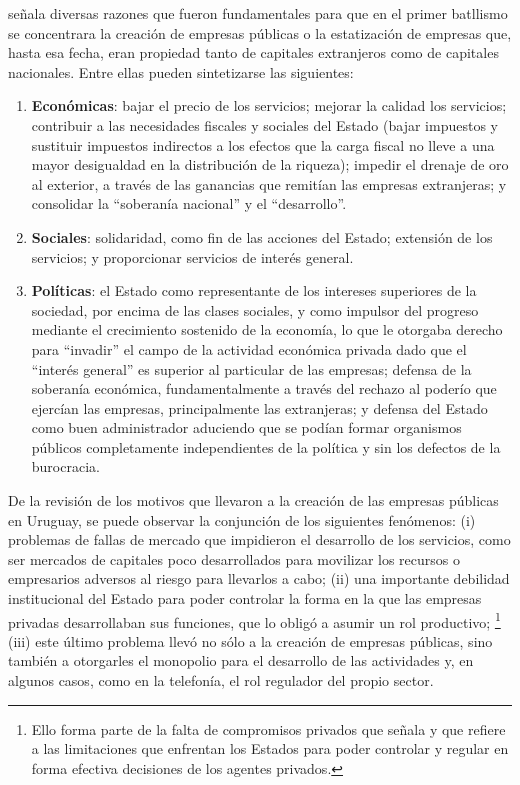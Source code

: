 \documentclass[
  12pt,
  spanish,
]{book}
\begin{document}
\citet{Nahum1993} señala diversas razones que fueron fundamentales para que en el primer batllismo se concentrara la creación de empresas públicas o la estatización de empresas que, hasta esa fecha, eran propiedad tanto de capitales extranjeros como de capitales nacionales. Entre ellas pueden sintetizarse las siguientes:

\begin{enumerate}
\def\labelenumi{\arabic{enumi}.}
\item
  \textbf{Económicas}: bajar el precio de los servicios; mejorar la calidad los servicios; contribuir a las necesidades fiscales y sociales del Estado (bajar impuestos y sustituir impuestos indirectos a los efectos que la carga fiscal no lleve a una mayor desigualdad en la distribución de la riqueza); impedir el drenaje de oro al exterior, a través de las ganancias que remitían las empresas extranjeras; y consolidar la ``soberanía nacional'' y el ``desarrollo''.
\item
  \textbf{Sociales}: solidaridad, como fin de las acciones del Estado; extensión de los servicios; y proporcionar servicios de interés general.
\item
  \textbf{Políticas}: el Estado como representante de los intereses superiores de la sociedad, por encima de las clases sociales, y como impulsor del progreso mediante el crecimiento sostenido de la economía, lo que le otorgaba derecho para ``invadir'' el campo de la actividad económica privada dado que el ``interés general'' es superior al particular de las empresas; defensa de la soberanía económica, fundamentalmente a través del rechazo al poderío que ejercían las empresas, principalmente las extranjeras; y defensa del Estado como buen administrador aduciendo que se podían formar organismos públicos completamente independientes de la política y sin los defectos de la burocracia.
\end{enumerate}

De la revisión de los motivos que llevaron a la creación de las empresas públicas en Uruguay, se puede observar la conjunción de los siguientes fenómenos: (i) problemas de fallas de mercado que impidieron el desarrollo de los servicios, como ser mercados de capitales poco desarrollados para movilizar los recursos o empresarios adversos al riesgo para llevarlos a cabo; (ii) una importante debilidad institucional del Estado para poder controlar la forma en la que las empresas privadas desarrollaban sus funciones, que lo obligó a asumir un rol productivo;
\footnote{Ello forma parte de la falta de compromisos privados que señala \citet{Perotti2004} y que refiere a las limitaciones que enfrentan los Estados para poder controlar y regular en forma efectiva decisiones de los agentes privados.}
(iii) este último problema llevó no sólo a la creación de empresas públicas, sino también a otorgarles el monopolio para el desarrollo de las actividades y, en algunos casos, como en la telefonía, el rol regulador del propio sector.
\end{document}
